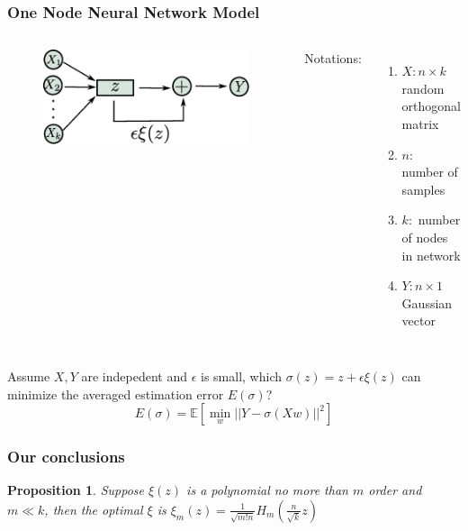 \documentclass{beamer}
\newtheorem{proposition}{Proposition}
\begin{document}
\begin{frame}
\frametitle{One Node Neural Network Model}
\begin{columns}
\column{5cm}
\begin{figure}
\includegraphics[width=\textwidth]{../network_structure.eps}
\end{figure}
\column{5cm}
Notations:
\begin{enumerate}
\item $X: n \times k$ random orthogonal matrix
\item $n :$ number of samples
\item $k: $ number of nodes in network 
\item $Y: n \times 1$ Gaussian vector
\end{enumerate}
\end{columns}
\vskip 0.5cm
Assume $X,Y$ are indepedent and $\epsilon$ is small, which $\sigma(z) = z + \epsilon \xi(z)$ can minimize the averaged estimation error $E(\sigma)$?
$$
E(\sigma)= \mathbb{E}[\min_{w} || Y - \sigma(X w) ||^2]
$$
\end{frame}
\begin{frame}
\frametitle{Our conclusions}
\begin{proposition}
Suppose $\xi(z)$ is a polynomial no more than $m$ order and $m\ll k$, then the optimal $\xi$ is $\xi_m(z) = \frac{1}{\sqrt{m! n}}H_m(\frac{n}{\sqrt{k}} z)$
\end{proposition}
\end{frame}
\end{document}
